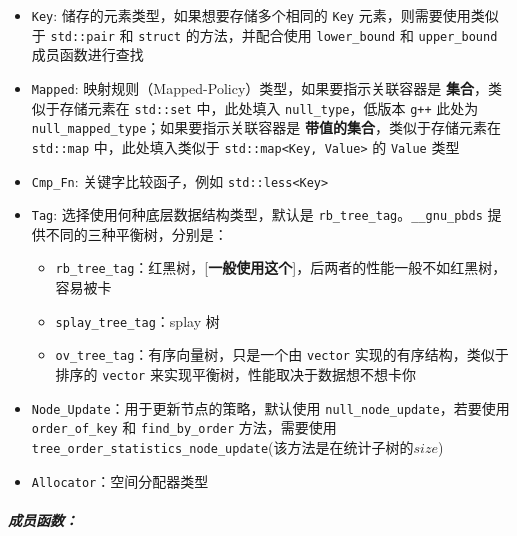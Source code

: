\documentclass[]{article}
\providecommand{\tightlist}{%
  \setlength{\itemsep}{0pt}\setlength{\parskip}{0pt}}
\let\oldsubparagraph\subparagraph
\renewcommand{\subparagraph}[1]{\oldsubparagraph{#1}\mbox{}}
\begin{document}
\begin{itemize}
\tightlist
\item
  \texttt{Key}: 储存的元素类型，如果想要存储多个相同的 \texttt{Key}
  元素，则需要使用类似于 \texttt{std::pair} 和 \texttt{struct}
  的方法，并配合使用 \texttt{lower\_bound} 和 \texttt{upper\_bound}
  成员函数进行查找
\item
  \texttt{Mapped}: 映射规则（Mapped-Policy）类型，如果要指示关联容器是
  \textbf{集合}，类似于存储元素在 \texttt{std::set} 中，此处填入
  \texttt{null\_type}，低版本 \texttt{g++} 此处为
  \texttt{null\_mapped\_type}；如果要指示关联容器是
  \textbf{带值的集合}，类似于存储元素在 \texttt{std::map}
  中，此处填入类似于
  \texttt{std::map\textless{}Key,\ Value\textgreater{}} 的
  \texttt{Value} 类型
\item
  \texttt{Cmp\_Fn}: 关键字比较函子，例如
  \texttt{std::less\textless{}Key\textgreater{}}
\item
  \texttt{Tag}: 选择使用何种底层数据结构类型，默认是
  \texttt{rb\_tree\_tag}。\texttt{\_\_gnu\_pbds}
  提供不同的三种平衡树，分别是：

  \begin{itemize}
  \tightlist
  \item
    \texttt{rb\_tree\_tag}：红黑树，{[}\textbf{一般使用这个}{]}，后两者的性能一般不如红黑树，容易被卡
  \item
    \texttt{splay\_tree\_tag}：splay 树
  \item
    \texttt{ov\_tree\_tag}：有序向量树，只是一个由 \texttt{vector}
    实现的有序结构，类似于排序的 \texttt{vector}
    来实现平衡树，性能取决于数据想不想卡你
  \end{itemize}
\item
  \texttt{Node\_Update}：用于更新节点的策略，默认使用
  \texttt{null\_node\_update}，若要使用 \texttt{order\_of\_key} 和
  \texttt{find\_by\_order} 方法，需要使用
  \texttt{tree\_order\_statistics\_node\_update}(该方法是在统计子树的\(size\))
\item
  \texttt{Allocator}：空间分配器类型
\end{itemize}

\hypertarget{ux6210ux5458ux51fdux6570}{%
\subparagraph{成员函数：}\label{ux6210ux5458ux51fdux6570}}
\end{document}
